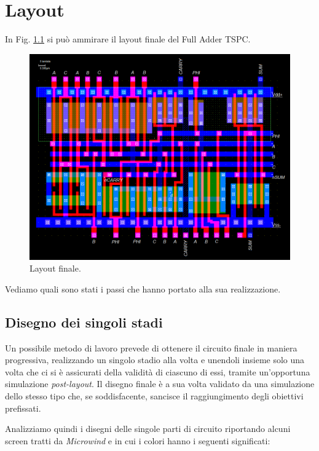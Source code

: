 
\chapter{Layout} %
\label{Chapter4} 

In Fig. \ref{fig:layout} si può ammirare il layout finale del Full Adder TSPC.

\begin{figure}[hbt!]
	\centering
	\includegraphics[width=1\textwidth]{figure/Msk_FullDesign.png}
	\caption{Layout finale.}
	\label{fig:layout}
\end{figure}

Vediamo quali sono stati i passi che hanno portato alla sua realizzazione.

\section{Disegno dei singoli stadi}
\label{sec:sec_disegnoStadi}

Un possibile metodo di lavoro prevede di ottenere il circuito finale in maniera progressiva, realizzando un singolo stadio alla volta e unendoli insieme solo una volta che ci si è assicurati della validità di ciascuno di essi, tramite un'opportuna simulazione \textit{post-layout}. Il disegno finale è a sua volta validato da una simulazione dello stesso tipo che, se soddisfacente, sancisce il raggiungimento degli obiettivi prefissati. 

Analizziamo quindi i disegni delle singole parti di circuito riportando alcuni screen tratti da \textit{Microwind} e in cui i colori hanno i seguenti significati:

